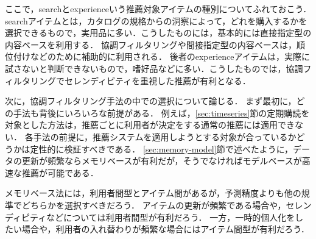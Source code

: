 ここで，searchとexperienceいう推薦対象アイテムの種別\cite{ej:053}についてふれておこう．
searchアイテムとは，カタログの規格からの洞察によって，どれを購入するかを選択できるもので，実用品に多い．こうしたものには，基本的には直接指定型の内容ベースを利用する．
協調フィルタリングや間接指定型の内容ベースは，順位付けなどのために補助的に利用される．
後者のexperienceアイテムは，実際に試さないと判断できないもので，嗜好品などに多い．こうしたものでは，協調フィルタリングでセレンディピティを重視した推薦が有利となる．

次に，協調フィルタリング手法の中での選択について論じる．
まず最初に，どの手法も背後にいろいろな前提がある．
例えば，\ref{sec:timeseries}節の定期購読を対象とした方法は，推薦ごとに利用者が決定をする通常の推薦には適用できない．
各手法の前提に，推薦システムを適用しようとする対象が合っているかどうかは定性的に検証すべきである．
\ref{sec:memory-model}節で述べたように，データの更新が頻繁ならメモリベースが有利だが，そうでなければモデルベースが高速な推薦が可能である．

メモリベース法には，利用者間型とアイテム間があるが，予測精度よりも他の規準でどちらかを選択すべきだろう．
アイテムの更新が頻繁である場合や，セレンディピティなどについては利用者間型が有利だろう．
一方，一時的個人化をしたい場合や，利用者の入れ替わりが頻繁な場合にはアイテム間型が有利だろう．

